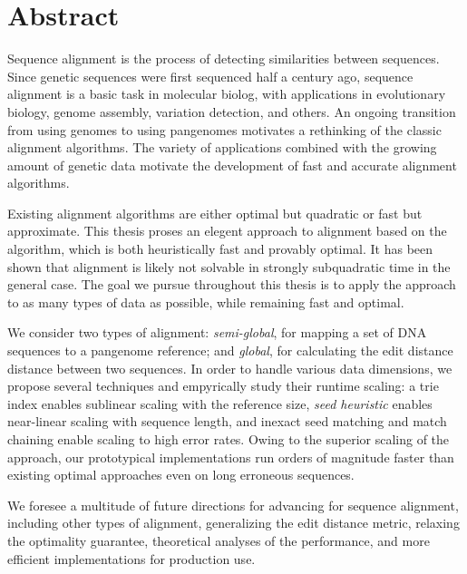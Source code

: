 \begingroup
\let\clearpage\relax
\let\cleardoublepage\relax
\let\cleardoublepage\relax

\chapter*{Abstract}

Sequence alignment is the process of detecting similarities between sequences.
Since genetic sequences were first sequenced half a century ago, sequence
alignment is a basic task in molecular biolog, with applications in evolutionary
biology, genome assembly, variation detection, and others. An ongoing transition
from using genomes to using pangenomes motivates a rethinking of the classic
alignment algorithms. The variety of applications combined with the growing
amount of genetic data motivate the development of fast and accurate alignment
algorithms. 

Existing alignment algorithms are either optimal but quadratic or fast but
approximate. This thesis proses an elegent approach to alignment based on the \A
algorithm, which is both heuristically fast and provably optimal. It has been
shown that alignment is likely not solvable in strongly subquadratic time in the
general case. The goal we pursue throughout this thesis is to apply the \A
approach to as many types of data as possible, while remaining fast and optimal.

We consider two types of alignment: \emph{semi-global}, for mapping a set of DNA
sequences to a pangenome reference; and \emph{global}, for calculating the edit
distance distance between two sequences. In order to handle various data
dimensions, we propose several techniques and empyrically study their runtime
scaling: a trie index enables sublinear scaling with the reference size,
\emph{seed heuristic} enables near-linear scaling with sequence length, and
inexact seed matching and match chaining enable scaling to high error rates.
Owing to the superior scaling of the \A approach, our prototypical
implementations run orders of magnitude faster than existing optimal approaches
even on long erroneous sequences.

We foresee a multitude of future directions for advancing \A for sequence
alignment, including other types of alignment, generalizing the edit distance
metric, relaxing the optimality guarantee, theoretical analyses of the
performance, and more efficient implementations for production use.

